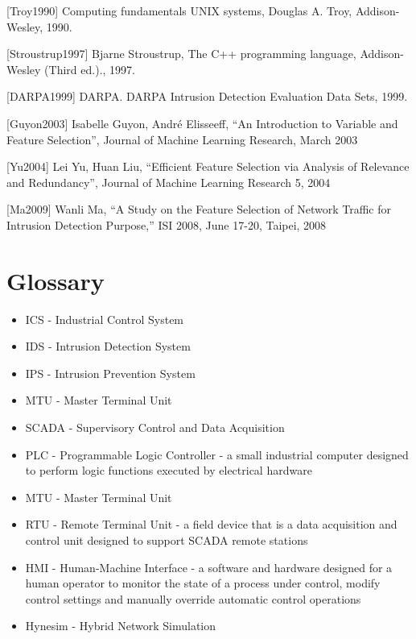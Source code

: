 \documentclass[12pt,]{article}
\begin{document}
{[}Troy1990{]} Computing fundamentals UNIX systems, Douglas A. Troy,
Addison-Wesley, 1990.

{[}Stroustrup1997{]} Bjarne Stroustrup, The C++ programming language,
Addison-Wesley (Third ed.)., 1997.

{[}DARPA1999{]} DARPA. DARPA Intrusion Detection Evaluation Data Sets,
1999.

{[}Guyon2003{]} Isabelle Guyon, André Elisseeff, ``An Introduction to
Variable and Feature Selection'', Journal of Machine Learning Research,
March 2003

{[}Yu2004{]} Lei Yu, Huan Liu, ``Efficient Feature Selection via
Analysis of Relevance and Redundancy'', Journal of Machine Learning
Research 5, 2004

{[}Ma2009{]} Wanli Ma, ``A Study on the Feature Selection of Network
Traffic for Intrusion Detection Purpose,'' ISI 2008, June 17-20, Taipei,
2008

\thispagestyle{empty} \pagebreak

\section*{Glossary}\label{glossary}

\begin{itemize}
\itemsep1pt\parskip0pt
\item
  ICS - Industrial Control System
\item
  IDS - Intrusion Detection System
\item
  IPS - Intrusion Prevention System
\item
  MTU - Master Terminal Unit
\item
  SCADA - Supervisory Control and Data Acquisition
\item
  PLC - Programmable Logic Controller - a small industrial computer
  designed to perform logic functions executed by electrical hardware
\item
  MTU - Master Terminal Unit
\item
  RTU - Remote Terminal Unit - a field device that is a data acquisition
  and control unit designed to support SCADA remote stations
\item
  HMI - Human-Machine Interface - a software and hardware designed for a
  human operator to monitor the state of a process under control, modify
  control settings and manually override automatic control operations
\item
  Hynesim - Hybrid Network Simulation
\end{itemize}

\thispagestyle{empty} \pagebreak
\end{document}
